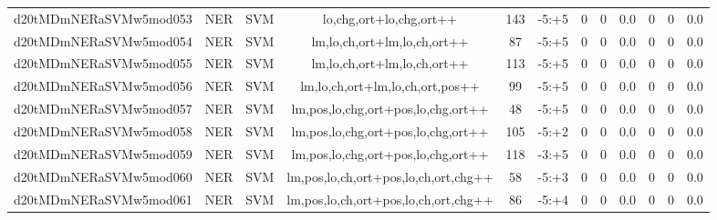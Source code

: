 \documentclass[a4paper]{article}
\begin{document}
\begin{landscape}
\begin{center}
\begin{tabular}{ |c|c|c|c|c|c|c|c|c|c|c|c|}
 
 	
 	\small{ d20tMDmNERaSVMw5mod053 } & \small{ NER} & \small{  SVM }  & lo,chg,ort+lo,chg,ort++  &  143 &  \small{  -5:+5 }  &  0 & 0 & 0.0  &  0 & 0 & 0.0 \\
 	

 
 	
 	\small{ d20tMDmNERaSVMw5mod054 } & \small{ NER} & \small{  SVM }  & lm,lo,ch,ort+lm,lo,ch,ort++  &  87 &  \small{  -5:+5 }  &  0 & 0 & 0.0  &  0 & 0 & 0.0 \\
 	

 
 	
 	\small{ d20tMDmNERaSVMw5mod055 } & \small{ NER} & \small{  SVM }  & lm,lo,ch,ort+lm,lo,ch,ort++  &  113 &  \small{  -5:+5 }  &  0 & 0 & 0.0  &  0 & 0 & 0.0 \\
 	

 
 	
 	\small{ d20tMDmNERaSVMw5mod056 } & \small{ NER} & \small{  SVM }  & lm,lo,ch,ort+lm,lo,ch,ort,pos++  &  99 &  \small{  -5:+5 }  &  0 & 0 & 0.0  &  0 & 0 & 0.0 \\
 	

 
 	
 	\small{ d20tMDmNERaSVMw5mod057 } & \small{ NER} & \small{  SVM }  & lm,pos,lo,chg,ort+pos,lo,chg,ort++  &  48 &  \small{  -5:+5 }  &  0 & 0 & 0.0  &  0 & 0 & 0.0 \\
 	

 
 	
 	\small{ d20tMDmNERaSVMw5mod058 } & \small{ NER} & \small{  SVM }  & lm,pos,lo,chg,ort+pos,lo,chg,ort++  &  105 &  \small{  -5:+2 }  &  0 & 0 & 0.0  &  0 & 0 & 0.0 \\
 	

 
 	
 	\small{ d20tMDmNERaSVMw5mod059 } & \small{ NER} & \small{  SVM }  & lm,pos,lo,chg,ort+pos,lo,chg,ort++  &  118 &  \small{  -3:+5 }  &  0 & 0 & 0.0  &  0 & 0 & 0.0 \\
 	

 
 	
 	\small{ d20tMDmNERaSVMw5mod060 } & \small{ NER} & \small{  SVM }  & lm,pos,lo,ch,ort+pos,lo,ch,ort,chg++  &  58 &  \small{  -5:+3 }  &  0 & 0 & 0.0  &  0 & 0 & 0.0 \\
 	

 
 	
 	\small{ d20tMDmNERaSVMw5mod061 } & \small{ NER} & \small{  SVM }  & lm,pos,lo,ch,ort+pos,lo,ch,ort,chg++  &  86 &  \small{  -5:+4 }  &  0 & 0 & 0.0  &  0 & 0 & 0.0 \\
 	


\end{tabular}
\end{center}
\end{landscape}
\end{document}
